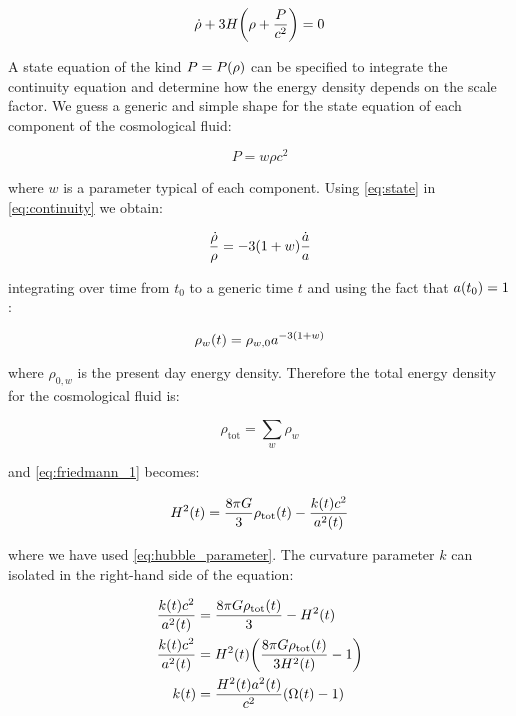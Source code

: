 \begin{equation}
        \dot \rho + 3 H \qty(\rho + \frac{P}{c^2}) = 0
        \label{eq:continuity}
\end{equation}

A state equation of the kind $P = P\qty(\rho)$ can be specified to
integrate the continuity equation and determine how the energy density
depends on the scale factor. We guess a generic and simple shape for the
state equation of each component of the cosmological fluid:

\begin{equation}
        P = w \rho c^2
        \label{eq:state}
\end{equation}

where $w$ is a parameter typical of each component.
Using \autoref{eq:state} in \autoref{eq:continuity} we obtain:

\begin{equation}
        \frac{\dot \rho}{\rho} = -3\qty(1 + w) \frac{\dot a}{a}
\end{equation}

integrating over time from $t_0$ to a generic time $t$ and using the fact
that $a\qty(t_0) = 1$:

\begin{equation}
        \rho_w\qty(t) = \rho_{w,0} a^{-3\qty(1 + w)}
\end{equation}

where $\rho_{0,w}$ is the present day energy density.
Therefore the total energy density for the cosmological fluid is:

\begin{equation}
        \rho_{\text{tot}} = \sum_w \rho_w
\end{equation}

and \autoref{eq:friedmann_1} becomes:

\begin{equation}
        H^2\qty(t) = \frac{8\pi G}{3} \rho_{\text{tot}}\qty(t) -
        \frac{k\qty(t) c^2}{a^2\qty(t)}
\end{equation}

where we have used \autoref{eq:hubble_parameter}. The curvature parameter
$k$ can isolated in the right-hand side of the equation:

\begin{equation}
        \begin{split}
                \frac{k\qty(t) c^2}{a^2\qty(t)} & =
                \frac{8\pi G \rho_{\text{tot}}\qty(t)}{3} - H^2\qty(t) \\
                \frac{k\qty(t) c^2}{a^2\qty(t)} & =
                H^2\qty(t) \qty(\frac{8\pi G \rho_{\text{tot}}\qty(t)}{3H^2\qty(t)} - 1) \\
                k(t) & = \frac{H^2\qty(t) a^2\qty(t)}{c^2} \qty(\Omega\qty(t) - 1) \\
        \end{split}
        \label{eq:friedmann_curvature}
\end{equation}


